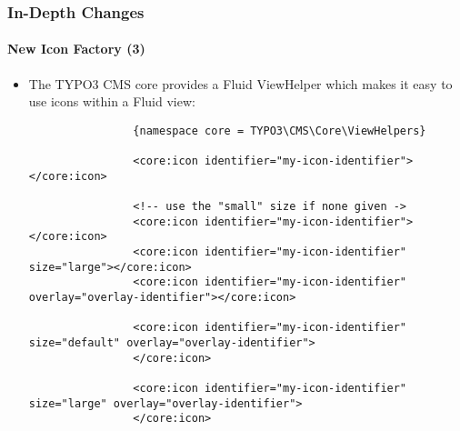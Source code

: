 \begin{frame}[fragile]
	\frametitle{In-Depth Changes}
	\framesubtitle{New Icon Factory (3)}

	\lstset{basicstyle=\tiny\ttfamily}

	\begin{itemize}

		\item The TYPO3 CMS core provides a Fluid ViewHelper which makes it easy to use icons within a Fluid view:

			\begin{lstlisting}
				{namespace core = TYPO3\CMS\Core\ViewHelpers}

				<core:icon identifier="my-icon-identifier"></core:icon>

				<!-- use the "small" size if none given ->
				<core:icon identifier="my-icon-identifier"></core:icon>
				<core:icon identifier="my-icon-identifier" size="large"></core:icon>
				<core:icon identifier="my-icon-identifier" overlay="overlay-identifier"></core:icon>

				<core:icon identifier="my-icon-identifier" size="default" overlay="overlay-identifier">
				</core:icon>

				<core:icon identifier="my-icon-identifier" size="large" overlay="overlay-identifier">
				</core:icon>
			\end{lstlisting}

	\end{itemize}

\end{frame}


